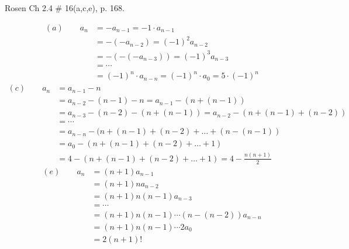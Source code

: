 \begin{questions}
 Rosen Ch 2.4 \# 16(a,c,e), p. 168.
    \ifprintanswers
        \vspace{-10pt}
   \fi
\begin{solution}
        \small \vspace{-0.2in}
        \begin{align*}
            (a) \quad \quad a_n &= -a_{n-1} = -1\cdot a_{n-1} \\
              &= -(-a_{n-2}) = (-1)^2a_{n-2} \\
              &= -(-(-a_{n-3})) = (-1)^3a_{n-3} \\
              &= \cdots \\
              &= (-1)^n\cdot a_{n-n} = (-1)^n\cdot a_{0} = 5\cdot(-1)^n
        \end{align*}
        \vspace{-0.1in} 
        \begin{align*}
            (c) \quad \quad a_n &= a_{n-1} - n \\
            &= a_{n-2} -(n-1) - n = a_{n-1} - (n + (n-1)) \\
            &= a_{n-3} -(n-2) - (n + (n-1)) = a_{n-2} - (n + (n-1) + (n-2)) \\
            &= \cdots \\
            &= a_{n-n} -(n + (n-1) + (n-2) + \ldots + (n- (n-1)) \\
            &= a_0 - (n + (n-1) + (n-2) + \ldots + 1) \\
            &= 4 - (n + (n-1) + (n-2) + \ldots + 1) = 4 -\frac{n(n+1)}{2}
        \end{align*}
        \vspace{-0.1in}
        \begin{align*}
            (e) \quad \quad a_n &= (n+1)a_{n-1} \\
              &= (n+1)na_{n-2} \\
              &= (n+1)n(n-1)a_{n-3} \\
              &= \cdots \\
              &= (n+1)n(n-1)\cdots(n-(n-2))a_{n-n} \\
              &= (n+1)n(n-1)\cdots2a_{0} \\
              &= 2(n+1)!
        \end{align*}
\end{solution}




\end{questions}
